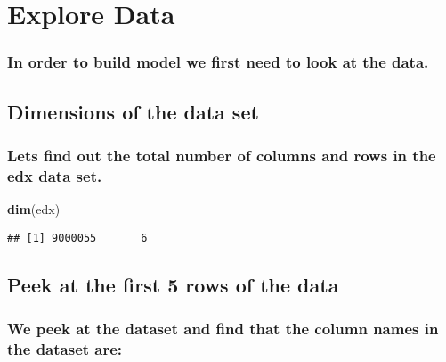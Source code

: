 \documentclass[
]{article}
\newenvironment{Shaded}{\begin{snugshade}}{\end{snugshade}}
\newcommand{\KeywordTok}[1]{\textcolor[rgb]{0.13,0.29,0.53}{\textbf{#1}}}
\newcommand{\NormalTok}[1]{#1}
\begin{document}
\hypertarget{explore-data}{%
\section{Explore Data}\label{explore-data}}

\hypertarget{in-order-to-build-model-we-first-need-to-look-at-the-data.}{%
\subsubsection{In order to build model we first need to look at the
data.}\label{in-order-to-build-model-we-first-need-to-look-at-the-data.}}

\hypertarget{dimensions-of-the-data-set}{%
\subsection{Dimensions of the data
set}\label{dimensions-of-the-data-set}}

\hypertarget{lets-find-out-the-total-number-of-columns-and-rows-in-the-edx-data-set.}{%
\subsubsection{Lets find out the total number of columns and rows in the
edx data
set.}\label{lets-find-out-the-total-number-of-columns-and-rows-in-the-edx-data-set.}}

\begin{Shaded}
\begin{Highlighting}[]
\KeywordTok{dim}\NormalTok{(edx)}
\end{Highlighting}
\end{Shaded}

\begin{verbatim}
## [1] 9000055       6
\end{verbatim}

\hypertarget{peek-at-the-first-5-rows-of-the-data}{%
\subsection{Peek at the first 5 rows of the
data}\label{peek-at-the-first-5-rows-of-the-data}}

\hypertarget{we-peek-at-the-dataset-and-find-that-the-column-names-in-the-dataset-are}{%
\subsubsection{We peek at the dataset and find that the column names in
the dataset
are:}\label{we-peek-at-the-dataset-and-find-that-the-column-names-in-the-dataset-are}}
\end{document}
